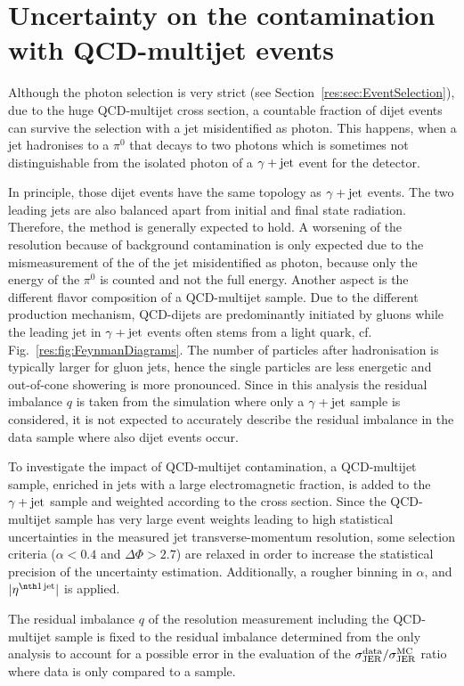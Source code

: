 \section*{Uncertainty on the contamination with QCD-multijet events}
Although the photon selection is very strict (see Section~\ref{res:sec:EventSelection}), 
due to the huge QCD-multijet cross section, a countable fraction of dijet events can survive the selection with a jet misidentified as photon.
This happens, when \eg a jet hadronises to a $\pi^0$ that decays to two photons which is sometimes not distinguishable from the isolated photon of a $\gamma + \text{jet}$ event for the detector.

In principle, those dijet events have the same topology as $\gamma + \text{jet}$ events. The two leading jets are also balanced apart from initial and final state radiation. 
Therefore, the method is generally expected to hold. 
A worsening of the resolution because of background contamination is only expected due to the mismeasurement of the \pt of the jet misidentified as photon, because only the energy of the $\pi^0$ is counted and not the full energy.
Another aspect is the different flavor composition of a QCD-multijet sample. 
Due to the different production mechanism, QCD-dijets are predominantly initiated by gluons while the leading jet in $\gamma + \text{jet}$ events often stems from a light quark, cf. Fig.~\ref{res:fig:FeynmanDiagrams}.
The number of particles after hadronisation is typically larger for gluon jets, hence the single particles are less energetic and out-of-cone showering is more pronounced.
Since in this analysis the residual imbalance $q$ is taken from the simulation where only a $\gamma + \text{jet}$ sample is considered, it is not expected to accurately describe the residual imbalance in the data sample where also dijet events occur.

To investigate the impact of QCD-multijet contamination, a QCD-multijet sample, enriched in jets with a large electromagnetic fraction, is added to the $\gamma + \text{jet}$ sample and weighted according to the cross section.
Since the QCD-multijet sample has very large event weights leading to high statistical uncertainties in the measured jet transverse-momentum resolution, some selection criteria ($\alpha<0.4$ and $\Delta\Phi>2.7$) are relaxed in order to increase the statistical precision of the uncertainty estimation.
Additionally, a rougher binning in $\alpha$, \ptgamma and $|\etafirstjet|$ is applied.

The residual imbalance $q$ of the resolution measurement including the QCD-multijet sample is fixed to the residual imbalance determined from the \GAMJET only analysis to account for a possible error in the evaluation of the $\sigma_\mathrm{JER}^{\text{data}}/\sigma_\mathrm{JER}^{\text{MC}}$ ratio where data is only compared to a \GAMJET sample.

